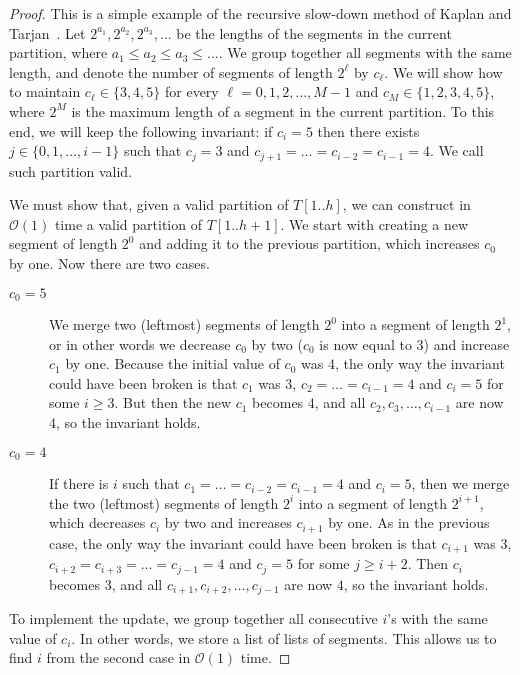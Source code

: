 \documentclass{article}[11pt,letter]
\newcommand{\bigo}{\mathcal{O}}
\newcommand{\head}{h}
\begin{document}
\begin{proof}
This is a simple example of the recursive slow-down method of Kaplan and Tarjan~\cite{KaplanSlowdown}.
Let $2^{a_{1}}, 2^{a_{2}}, 2^{a_{3}}, \ldots$ be the lengths of the segments in the current partition, where $a_{1}\leq a_{2}\leq a_{3}\leq\ldots$.
We group together all segments with the same length, and denote the number of segments of length $2^{\ell}$ by $c_{\ell}$.
We will show how to maintain $c_{\ell}\in\{3,4,5\}$ for every $\ell=0,1,2,\ldots,M-1$ and $c_{M}\in\{1,2,3,4,5\}$,
where $2^{M}$ is the maximum length of a segment
in the current partition. To this end, we will keep the following invariant: if $c_{i}=5$ then there exists $j\in\{0,1,\ldots,i-1\}$ such that $c_{j}=3$ 
and $c_{j+1}=\ldots=c_{i-2}=c_{i-1}=4$. We call such partition valid.

We must show that, given a valid partition of $T[1..\head]$, we
can construct in $\bigo(1)$ time a valid partition of $T[1..\head+1]$. We start with creating a new segment of length $2^{0}$ and adding it to the
previous partition, which increases $c_{0}$ by one. Now there are two cases.

\begin{description}
\item[$c_{0}=5$] We merge two (leftmost) segments of length $2^{0}$ into a segment of length $2^{1}$, or in other words
we decrease $c_{0}$ by two ($c_0$ is now equal to 3) and increase $c_{1}$ by one. Because the initial value of $c_{0}$ was $4$, the only way the invariant could have been
broken is that $c_{1}$ was $3$, $c_{2}=\ldots=c_{i-1}=4$ and $c_{i}=5$ for some $i\geq 3$. But then the new $c_{1}$ becomes $4$,
and all $c_{2}, c_{3}, \ldots, c_{i-1}$ are now $4$, so the invariant holds.
\item[$c_{0}=4$] If there is $i$ such that $c_1=\ldots=c_{i-2}=c_{i-1}=4$ and $c_{i}=5$, then we merge the two
(leftmost) segments of length $2^{i}$ into a segment of length $2^{i+1}$, which decreases $c_{i}$ by two and increases $c_{i+1}$ by one.
As in the previous case, the only way the invariant could have been broken is that $c_{i+1}$ was $3$, $c_{i+2}=c_{i+3}=\ldots=c_{j-1}=4$
and $c_{j}=5$ for some $j\geq i+2$. Then $c_{i}$ becomes $3$, and all $c_{i+1}, c_{i+2},\ldots,c_{j-1}$ are now $4$, so the invariant holds.
\end{description}

To implement the update, we group together all consecutive $i$'s with the same value of $c_{i}$. In other words, we store a list of lists of segments.
This allows us to find $i$ from the second case in $\bigo(1)$ time.
\end{proof}
\end{document}

